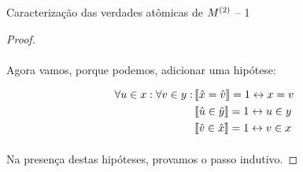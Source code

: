 \begin{theorem}{Caracterização das verdades atômicas de $M^{(2)}$ -- 1}
\begin{proof}
            \paragraph{}
                Agora vamos, porque podemos, adicionar uma hipótese:

            \begin{align*}
                \forall u\in x:\forall v\in y:&\left\llbracket\hat x = \hat v\right\rrbracket = 1 \leftrightarrow x   = v\\
                &\left\llbracket\hat u \in \hat y\right\rrbracket = 1 \leftrightarrow u \in y\\
                &\left\llbracket\hat v \in \hat x\right\rrbracket = 1 \leftrightarrow v \in x
            \end{align*}
            \paragraph{}
                Na presença destas hipóteses, provamos o passo indutivo.\eop
        \end{proof}
    \end{theorem} 

